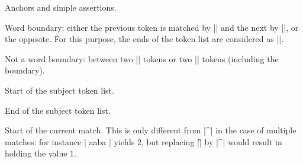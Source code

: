 \documentclass[oneside]{book}
\begin{document}
Anchors and simple assertions.
\begin{l3regex-syntax}
  \item[\\b] Word boundary: either the previous token is matched by
    |\w| and the next by |\W|, or the opposite. For this purpose,
    the ends of the token list are considered as |\W|.
  \item[\\B] Not a word boundary: between two |\w| tokens
    or two |\W| tokens (including the boundary).
  \item[\char`^ \textrm{or} \\A]
    Start of the subject token list.
  \item[\char`$\textrm{,} \\Z \textrm{or} \\z] %
    End of the subject token list.
  \item[\\G] Start of the current match. This is only different from |^|
    in the case of multiple matches: for instance
    | {aaba} \lTmpaInt| yields $2$, but
    replacing |\G| by |^| would result in  holding the
    value $1$.
\end{l3regex-syntax}
\end{document}
